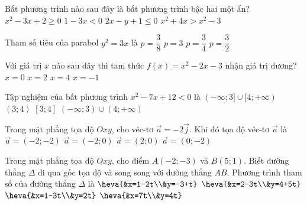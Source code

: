 \begin{ex}%
	Bất phương trình nào sau đây là bất phương trình bậc hai một ẩn?
	\choice
	{\True $x^2-3x+2\ge 0$}
	{$1-3x<0$}
	{$2x-y+1\le 0$}
	{$x^2+4x>x^2-3$}
\end{ex}
\begin{ex}%
	Tham số tiêu của parabol $y^2=3x$ là
	\choice
	{$p=\dfrac{3}{8}$}
	{$p=3$}
	{$p=\dfrac{3}{4}$}
	{\True $p=\dfrac{3}{2}$}
\end{ex}
\begin{ex}%
	Với giá trị $x$ nào sau đây thì tam thức $f(x)=x^2-2x-3$ nhận giá trị dương?
	\choice
	{$x=0$}
	{$x=2$}
	{\True $x=4$}
	{$x=-1$}
\end{ex}
\begin{ex}%
	Tập nghiệm của bất phương trình $x^2-7x+12<0$ là
	\choice
	{$(-\infty;3]\cup [4;+\infty)$}
	{\True $(3;4)$}
	{$[3;4]$}
	{$(-\infty;3)\cup (4;+\infty)$}
\end{ex}
\begin{ex}%
	Trong mặt phẳng tọa độ $Oxy$, cho véc-tơ $\vec{a}=-2\vec{j}$. Khi đó tọa độ véc-tơ $\vec{a}$ là
	\choice
	{$\vec{a}=(-2;-2)$}
	{$\vec{a}=(-2;0)$}
	{$\vec{a}=(2;0)$}
	{\True $\vec{a}=(0;-2)$}
\end{ex}
\begin{ex}%
	Trong mặt phẳng tọa độ $Oxy$, cho điểm $A(-2;-3)$ và $B(5;1)$. Biết đường thẳng $\Delta$ đi qua gốc tọa độ và song song với đường thẳng $AB$. Phương trình tham số của đường thẳng $\Delta$ là
	\choice
	{$\heva{&x=1-2t\\&y=-3+t}$}
	{$\heva{&x=2-3t\\&y=4+5t}$}
	{$\heva{&x=1-3t\\&y=2t}$}
	{\True $\heva{&x=7t\\&y=4t}$}
\end{ex}
